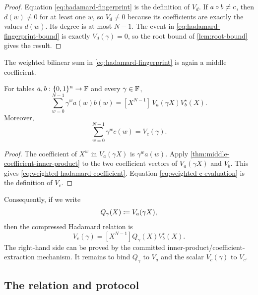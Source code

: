 \begin{proof}
Equation \eqref{eq:hadamard-fingerprint} is the definition of $V_d$.  If $a\circ b\ne c$, then $d(w)\ne0$ for at least one $w$, so $V_d\ne0$ because its coefficients are exactly the values $d(w)$.  Its degree is at most $N-1$.  The event in \eqref{eq:hadamard-fingerprint-bound} is exactly $V_d(\gamma)=0$, so the root bound of \cref{lem:root-bound} gives the result.
\end{proof}

The weighted bilinear sum in \eqref{eq:hadamard-fingerprint} is again a middle coefficient.

\begin{lemma}
\label{lem:weighted-hadamard-coefficient}
For tables $a,b:\{0,1\}^n\to\mathbb{F}$ and every $\gamma\in\mathbb{F}$,
\begin{equation}
  \sum_{w=0}^{N-1}\gamma^wa(w)b(w)
  =
  [X^{N-1}]\,V_a(\gamma X)V_b^{\star}(X).
  \label{eq:weighted-hadamard-coefficient}
\end{equation}
Moreover,
\begin{equation}
  \sum_{w=0}^{N-1}\gamma^wc(w)=V_c(\gamma).
  \label{eq:weighted-c-evaluation}
\end{equation}
\end{lemma}

\begin{proof}
The coefficient of $X^w$ in $V_a(\gamma X)$ is $\gamma^wa(w)$.  Apply \cref{thm:middle-coefficient-inner-product} to the two coefficient vectors of $V_a(\gamma X)$ and $V_b$.  This gives \eqref{eq:weighted-hadamard-coefficient}.  Equation \eqref{eq:weighted-c-evaluation} is the definition of $V_c$.
\end{proof}

Consequently, if we write
\begin{equation}
  Q_\gamma(X)\coloneqq V_a(\gamma X),
  \label{eq:hadamard-Q-honest}
\end{equation}
then the compressed Hadamard relation is
\begin{equation}
  V_c(\gamma)
  = [X^{N-1}]Q_\gamma(X)V_b^{\star}(X).
  \label{eq:hadamard-compressed-relation}
\end{equation}
The right-hand side can be proved by the committed inner-product/coefficient-extraction mechanism.  It remains to bind $Q_\gamma$ to $V_a$ and the scalar $V_c(\gamma)$ to $V_c$.

\subsection{The relation and protocol}
\label{sec:hadamard-protocol}

